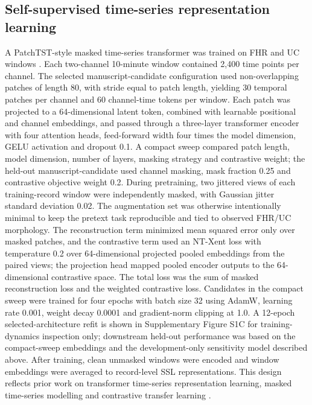 \documentclass[11pt]{article}
\begin{document}
\subsection{Self-supervised time-series representation learning}

A PatchTST-style masked time-series transformer was trained on FHR and UC windows \cite{nie2023}. Each two-channel 10-minute window contained 2,400 time points per channel. The selected manuscript-candidate configuration used non-overlapping patches of length 80, with stride equal to patch length, yielding 30 temporal patches per channel and 60 channel-time tokens per window. Each patch was projected to a 64-dimensional latent token, combined with learnable positional and channel embeddings, and passed through a three-layer transformer encoder with four attention heads, feed-forward width four times the model dimension, GELU activation and dropout 0.1. A compact sweep compared patch length, model dimension, number of layers, masking strategy and contrastive weight; the held-out manuscript-candidate used channel masking, mask fraction 0.25 and contrastive objective weight 0.2. During pretraining, two jittered views of each training-record window were independently masked, with Gaussian jitter standard deviation 0.02. The augmentation set was otherwise intentionally minimal to keep the pretext task reproducible and tied to observed FHR/UC morphology. The reconstruction term minimized mean squared error only over masked patches, and the contrastive term used an NT-Xent loss with temperature 0.2 over 64-dimensional projected pooled embeddings from the paired views; the projection head mapped pooled encoder outputs to the 64-dimensional contrastive space. The total loss was the sum of masked reconstruction loss and the weighted contrastive loss. Candidates in the compact sweep were trained for four epochs with batch size 32 using AdamW, learning rate 0.001, weight decay 0.0001 and gradient-norm clipping at 1.0. A 12-epoch selected-architecture refit is shown in Supplementary Figure S1C for training-dynamics inspection only; downstream held-out performance was based on the compact-sweep embeddings and the development-only sensitivity model described above. After training, clean unmasked windows were encoded and window embeddings were averaged to record-level SSL representations. This design reflects prior work on transformer time-series representation learning, masked time-series modelling and contrastive transfer learning \cite{zerveas2021,nie2023,yue2022,zhang2022tfc,goswami2024moment}.
\end{document}
